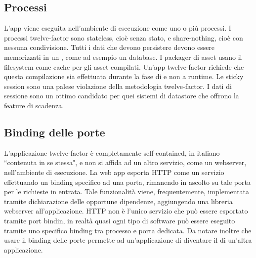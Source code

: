 \documentclass[NormeDiProgetto.tex]{subfiles}
\begin{document}
\subsection{Processi}
L'app viene eseguita nell'ambiente di esecuzione come uno o più processi. I processi twelve-factor sono stateless, cioè senza stato, e share-nothing, cioè con nessuna condivisione. Tutti i dati che devono persistere devono essere memorizzati in un , come ad esempio un database.
I packager di asset usano il filesystem come cache per gli asset compilati. Un'app twelve-factor richiede che questa compilazione sia effettuata durante la fase di  e non a runtime.
Le sticky session sono una palese violazione della metodologia twelve-factor. I dati di sessione sono un ottimo candidato per quei sistemi di datastore che offrono la feature di scadenza.

\subsection{Binding delle porte}
L'applicazione twelve-factor è completamente self-contained, in italiano \textquotedblleft contenuta in se stessa", e non si affida ad un altro servizio, come un webserver, nell'ambiente di esecuzione. La web app esporta HTTP come un servizio effettuando un binding specifico ad una porta, rimanendo in ascolto su tale porta per le richieste in entrata. Tale funzionalità viene, frequentemente, implementata tramite dichiarazione delle opportune dipendenze, aggiungendo una libreria webserver all'applicazione.
HTTP non è l'unico servizio che può essere esportato tramite port bindin, in realtà quasi ogni tipo di software può essere eseguito tramite uno specifico binding tra processo e porta dedicata.
Da notare inoltre che usare il binding delle porte permette ad un'applicazione di diventare il  di un'altra applicazione.
\end{document}
